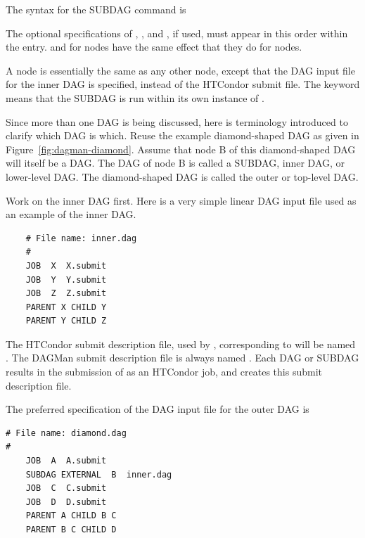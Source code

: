 The syntax for the SUBDAG command is

   
  

The optional specifications of , , and ,
if used, must appear in this order within the entry.
 and  for  nodes have the same effect
that they do for  nodes.

A  node is essentially the same as any other node,
except that the DAG input file for the inner DAG is specified,
instead of the HTCondor submit file.
The keyword  means that the
SUBDAG is run within its own instance of .

Since more than one DAG is being discussed, 
here is terminology introduced to clarify which DAG is which. 
Reuse the example diamond-shaped DAG as given in 
Figure~\ref{fig:dagman-diamond}.
Assume that node B of this diamond-shaped DAG
will itself be a DAG.
The DAG of node B is called a SUBDAG, inner DAG, or lower-level DAG.
The diamond-shaped DAG is called the outer or top-level DAG.

Work on the inner DAG first.
Here is a very simple linear DAG input file used as
an example of the inner DAG.
\begin{verbatim}
    # File name: inner.dag
    #
    JOB  X  X.submit
    JOB  Y  Y.submit
    JOB  Z  Z.submit
    PARENT X CHILD Y
    PARENT Y CHILD Z
\end{verbatim}

The HTCondor submit description file, used by ,
corresponding to  will be named
.  The DAGMan submit description file is always
named .
Each DAG or SUBDAG results in the submission of 
as an HTCondor job, and  creates this
submit description file.

The preferred specification of the DAG input file for the outer DAG is
\begin{verbatim}
# File name: diamond.dag
#
    JOB  A  A.submit 
    SUBDAG EXTERNAL  B  inner.dag
    JOB  C  C.submit	
    JOB  D  D.submit
    PARENT A CHILD B C
    PARENT B C CHILD D
\end{verbatim}


